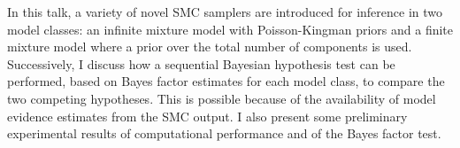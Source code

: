 In this talk, a variety of novel SMC samplers are introduced for
inference in two model classes: an infinite mixture model with
Poisson-Kingman priors and a finite mixture model where a prior
over the total number of components is used. Successively, I discuss
how a sequential Bayesian hypothesis test can be performed, based
on Bayes factor estimates for each model class, to compare the two
competing hypotheses. This is possible because of the availability of
model evidence estimates from the SMC output. I also present some
preliminary experimental results of computational performance and
of the Bayes factor test.